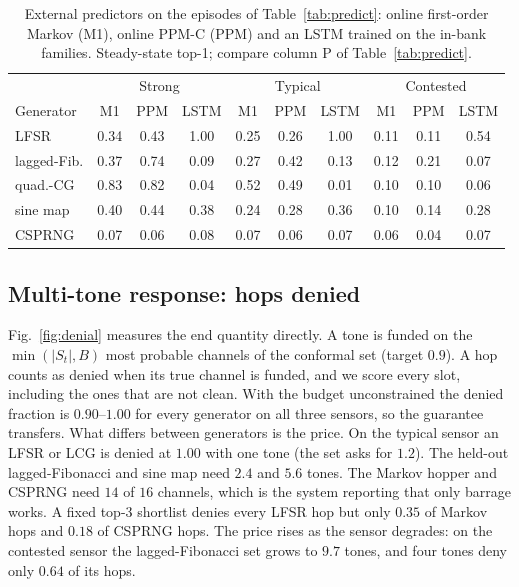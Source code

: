 \documentclass[conference]{IEEEtran}
\begin{document}
\begin{table}[t]
\centering
\caption{External predictors on the episodes of Table~\ref{tab:predict}:
online first-order Markov (M1), online PPM-C (PPM) and an LSTM trained on the
in-bank families. Steady-state top-1; compare column P of
Table~\ref{tab:predict}.}
\label{tab:predbase}
\setlength{\tabcolsep}{2.4pt}
\footnotesize
\begin{tabular}{@{}lccccccccc@{}}
\toprule
 & \multicolumn{3}{c}{Strong} & \multicolumn{3}{c}{Typical} & \multicolumn{3}{c}{Contested} \\
Generator & M1 & PPM & LSTM & M1 & PPM & LSTM & M1 & PPM & LSTM \\
\midrule
LFSR        & 0.34 & 0.43 & 1.00 & 0.25 & 0.26 & 1.00 & 0.11 & 0.11 & 0.54 \\
lagged-Fib. & 0.37 & 0.74 & 0.09 & 0.27 & 0.42 & 0.13 & 0.12 & 0.21 & 0.07 \\
quad.-CG    & 0.83 & 0.82 & 0.04 & 0.52 & 0.49 & 0.01 & 0.10 & 0.10 & 0.06 \\
sine map    & 0.40 & 0.44 & 0.38 & 0.24 & 0.28 & 0.36 & 0.10 & 0.14 & 0.28 \\
CSPRNG      & 0.07 & 0.06 & 0.08 & 0.07 & 0.06 & 0.07 & 0.06 & 0.04 & 0.07 \\
\bottomrule
\end{tabular}
\end{table}

\subsection{Multi-tone response: hops denied}
Fig.~\ref{fig:denial} measures the end quantity directly. A tone is funded on
the $\min(|S_t|,B)$ most probable channels of the conformal set (target
$0.9$). A hop counts as denied when its true channel is funded, and we score
every slot, including the ones that are not clean. With the budget
unconstrained the denied fraction is $0.90$--$1.00$ for every generator on all
three sensors, so the guarantee transfers. What differs between generators is
the price. On the typical sensor an LFSR or LCG is denied at $1.00$ with one
tone (the set asks for $1.2$). The held-out lagged-Fibonacci and sine map need
$2.4$ and $5.6$ tones. The Markov hopper and CSPRNG need $14$ of $16$ channels,
which is the system reporting that only barrage works. A fixed top-3 shortlist
denies every LFSR hop but only $0.35$ of Markov hops and $0.18$ of CSPRNG hops.
The price rises as the sensor degrades: on the contested sensor the
lagged-Fibonacci set grows to $9.7$ tones, and four tones deny only $0.64$ of
its hops.
\end{document}
